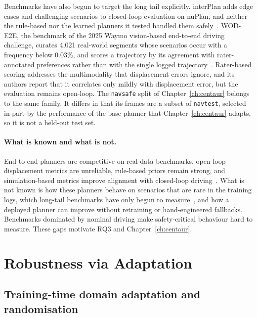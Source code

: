 Benchmarks have also begun to target the long tail explicitly. interPlan adds edge cases and challenging scenarios to closed-loop evaluation on nuPlan, and neither the rule-based nor the learned planners it tested handled them safely~\cite{hallgarten2024interplan}. WOD-E2E, the benchmark of the 2025 Waymo vision-based end-to-end driving challenge, curates 4,021 real-world segments whose scenarios occur with a frequency below 0.03\%, and scores a trajectory by its agreement with rater-annotated preferences rather than with the single logged trajectory~\cite{xu2026wode2e}. Rater-based scoring addresses the multimodality that displacement errors ignore, and its authors report that it correlates only mildly with displacement error, but the evaluation remains open-loop. The \texttt{navsafe} split of Chapter~\ref{ch:centaur} belongs to the same family. It differs in that its frames are a subset of \texttt{navtest}, selected in part by the performance of the base planner that Chapter~\ref{ch:centaur} adapts, so it is not a held-out test set.

\paragraph{What is known and what is not.} End-to-end planners are competitive on real-data benchmarks, open-loop displacement metrics are unreliable, rule-based priors remain strong, and simulation-based metrics improve alignment with closed-loop driving~\cite{codevilla2018offline,li2024ego,dauner2023parting,dauner2024navsim,cao2025pseudo}. What is not known is how these planners behave on scenarios that are rare in the training logs, which long-tail benchmarks have only begun to measure~\cite{hallgarten2024interplan,xu2026wode2e}, and how a deployed planner can improve without retraining or hand-engineered fallbacks. Benchmarks dominated by nominal driving make safety-critical behaviour hard to measure. These gaps motivate RQ3 and Chapter~\ref{ch:centaur}.

\section{Robustness via Adaptation}\label{sec:bg:adapt}

\subsection{Training-time domain adaptation and randomisation}


